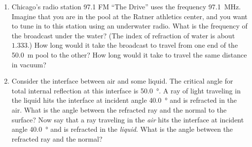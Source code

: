 \documentclass[11pt]{article}
\begin{document}
\begin{enumerate}

\newcommand{\freq}{\SI{97.1}{\mega\Hz}}
\newcommand{\length}{\SI{50.0}{\meter}}

\item Chicago's radio station 97.1 FM ``The Drive'' uses the frequency {\freq}.  Imagine that you are in the pool at the Ratner athletics center, and you want to tune in to this station using an underwater radio.  What is the frequency of the broadcast under the water?  (The index of refraction of water is about $1.333$.)  How long would it take the broadcast to travel from one end of the {\length} pool to the other?  How long would it take to travel the same distance in vacuum?


\newcommand{\critang}{\SI{50.0}{\degree}}
\newcommand{\intang}{\SI{40.0}{\degree}}

\item Consider the interface between air and some liquid.  The critical angle for total internal reflection at this interface is {\critang}.  A ray of light traveling in the liquid hits the interface at incident angle {\intang} and is refracted in the air.  What is the angle between the refracted ray and the normal to the surface?  Now say that a ray traveling in the \emph{air} hits the interface at incident angle {\intang} and is refracted in the \emph{liquid}.  What is the angle between the refracted ray and the normal?

\end{enumerate}
\end{document}
